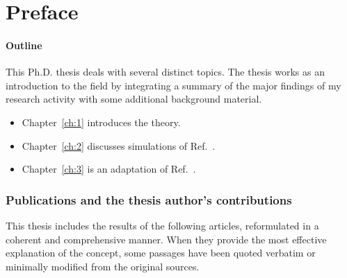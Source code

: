 \documentclass[../main]{subfiles}
\begin{document}
\chapter{Preface}
\lipsum[1-10]


\newrefcontext[labelprefix=P]
\nocite{Doe_PRB_2021}
\nocite{Doe_npjFP_2022}
\nocite{Doe_2023}

\clearpage
\subsubsection{Outline}
This Ph.D. thesis deals with several distinct topics. The thesis works as an introduction to the field by integrating a summary of the major findings of my research activity with some additional background material.

\begin{itemize}
    \item Chapter~\ref{ch:1} introduces the theory.
    
    \item Chapter~\ref{ch:2} discusses simulations of Ref.~\cite{Doe_PRB_2021, Doe_npjFP_2022}.
    
    \item Chapter~\ref{ch:3} is an adaptation of Ref.~\cite{Doe_2023}. 
    
\end{itemize}

\subsection{Publications and the thesis author’s contributions}
This thesis includes the results of the following articles, reformulated in a coherent and comprehensive manner. When they provide the most effective explanation of the concept, some passages have been quoted verbatim or minimally modified from the original sources.
\end{document}
